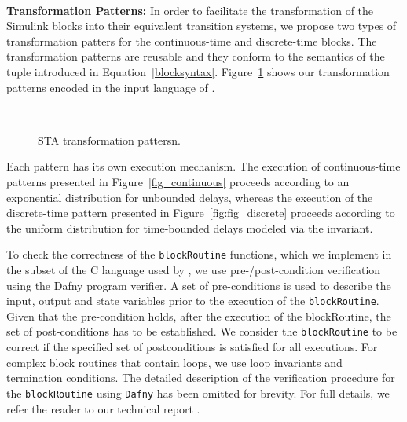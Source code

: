 \noindent\\ \textbf{Transformation Patterns: } In order to facilitate the transformation of the Simulink blocks into their equivalent transition systems, we propose two types of transformation patters for the continuous-time and discrete-time blocks. The transformation patterns are reusable and they conform to the semantics of the tuple introduced in Equation~\ref{blocksyntax}. Figure~\ref{fig_patterns} shows our transformation patterns encoded in the input language of \uppaalsmc.
\begin{figure}[] 
	\centering
	 ~
	\caption{STA transformation pattersn.} 
	\label{fig_patterns}
\end{figure}

Each pattern has its own execution mechanism. The execution of continuous-time patterns presented in Figure~\ref{fig_continuous} proceeds according to an exponential distribution for unbounded delays, whereas the execution of the discrete-time pattern presented in Figure~\ref{fig:fig_discrete} proceeds according to the uniform distribution for time-bounded delays modeled via the invariant.

To check the correctness of the \texttt{blockRoutine} functions, which we implement in the subset of the C language used by \uppaalsmc{}, we use pre-/post-condition verification using the Dafny \cite{leino2010dafny} program verifier. A set of pre-conditions is used to describe the input, output and state variables prior to the execution of the \texttt{blockRoutine}. Given that the pre-condition holds, after the execution of the blockRoutine, the set of post-conditions has to be established. We consider the \texttt{blockRoutine} to be correct if the specified set of postconditions is satisfied for all executions. For complex block routines that contain loops, we use loop invariants and termination conditions. The detailed description of the verification procedure for the \texttt{blockRoutine} using \texttt{Dafny} has been omitted for brevity. For full details, we refer the reader to our technical report \cite{filipovikj17S2UTR}. 

